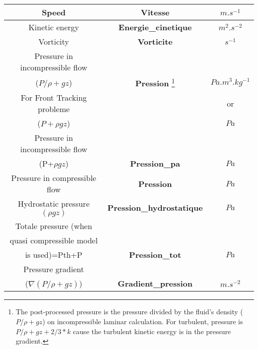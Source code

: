 \begin{itemize}
\begin{longtable}[hcr]{|c|c|c|}
Speed                                           & \textbf{Vitesse}                          & $m.s^{-1}$ \\ \hline
Kinetic energy                                  & \textbf{Energie\_cinetique}               & $m^2.s^{-2}$ \\ \hline
Vorticity                                       & \textbf{Vorticite}                        & $s^{-1}$ \\ \hline
Pressure in incompressible flow                 &                                           & \\
($P/\rho+gz$)                                   & \textbf{Pression} \footnote{The post-processed pressure is the pressure divided by the fluid's density ($P/\rho+gz$) on incompressible laminar calculation. For turbulent, pressure is $P/\rho+gz+2/3*k$ cause the turbulent kinetic energy is in the pressure gradient.}
                                                                                            & $Pa.m^3.kg^{-1}$ \\
For Front Tracking probleme                     &                                           & or \\
($P+\rho gz$)                                   &                                           &  $Pa$ \\ \hline
Pressure in incompressible flow                 &                                           &   \\
(P+$\rho gz$)                                   & \textbf{Pression\_pa}                     & $Pa$ \\ \hline
Pressure in compressible flow                   & \textbf{Pression}                         & $Pa$ \\ \hline
Hydrostatic pressure $(\rho g z)$                 & \textbf{Pression\_hydrostatique}           & $Pa$ \\ \hline
Totale pressure (when                           &                                           & \\
quasi compressible model                        &                                           & \\
is used)=Pth+P                                  & \textbf{Pression\_tot}                    & $Pa$ \\ \hline
Pressure gradient                               &                                           & \\
($\nabla(P/\rho+gz)$)                           & \textbf{Gradient\_pression}               & $m.s^{-2}$ \\ \hline

\end{longtable}
\end{itemize}
